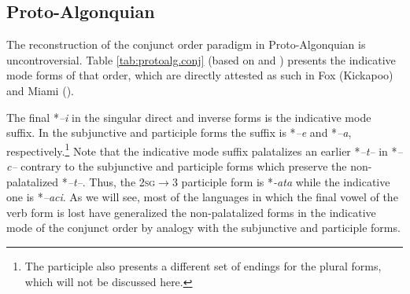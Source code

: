 \documentclass[twoside,a4paper,11pt]{article}
\newcommand{\ipa}[1]{{\phon\textit{#1}}}
\newcommand{\Σ}{\greek{Σ}}
\begin{document}
\subsection{Proto-Algonquian}
The reconstruction of the conjunct order paradigm in Proto-Algonquian is uncontroversial. Table \ref{tab:protoalg.conj} (based on \citealt{bloomfield46proto} and \citealt{goddard00cheyenne}) presents the indicative mode forms of that order, which are directly attested as such in Fox (Kickapoo) and Miami (\citealt{costa03miami}).

The final *\ipa{--i} in the singular direct and inverse forms is the indicative mode suffix. In the subjunctive and participle forms the suffix is *\ipa{--e} and *\ipa{--a}, respectively.\footnote{The participle also presents a different set of endings for the plural forms, which will not be discussed here.} Note that the indicative mode suffix palatalizes an earlier *\ipa{--t--} in *\ipa{--c--} contrary to the subjunctive and participle forms which preserve the non-palatalized *\ipa{--t--}. Thus, the \textsc{2sg$\rightarrow$3} participle form is *\ipa{-ata} while the indicative one is *\ipa{--aci}. As we will see, most of the languages in which the final vowel of the verb form is lost have generalized the non-palatalized forms in the indicative mode of the conjunct order by analogy with the subjunctive and participle forms.
\end{document}
